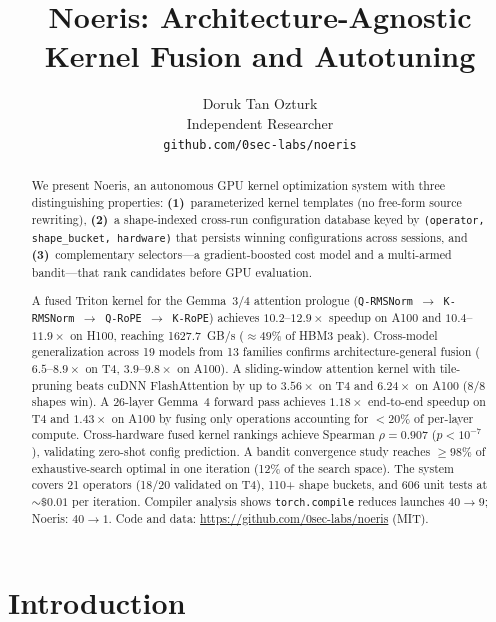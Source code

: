 \documentclass[11pt]{article}
\title{Noeris: Architecture-Agnostic Kernel Fusion and Autotuning}
\author{
  Doruk Tan Ozturk \\
  Independent Researcher \\
  \texttt{github.com/0sec-labs/noeris}
}
\date{}
\begin{document}
\maketitle

\begin{abstract}
We present Noeris, an autonomous GPU kernel optimization system with three
distinguishing properties: \textbf{(1)}~parameterized kernel templates (no
free-form source rewriting), \textbf{(2)}~a shape-indexed cross-run
configuration database keyed by \texttt{(operator, shape\_bucket, hardware)}
that persists winning configurations across sessions, and
\textbf{(3)}~complementary selectors---a gradient-boosted cost model and a
multi-armed bandit---that rank candidates before GPU evaluation.

A fused Triton kernel for the Gemma~3/4 attention prologue
(\texttt{Q-RMSNorm $\to$ K-RMSNorm $\to$ Q-RoPE $\to$ K-RoPE}) achieves
$10.2$--$12.9\times$ speedup on A100 and $10.4$--$11.9\times$ on H100,
reaching 1627.7~GB/s (${\approx}49\%$ of HBM3 peak). Cross-model
generalization across 19 models from 13 families confirms architecture-general
fusion ($6.5$--$8.9\times$ on T4, $3.9$--$9.8\times$ on A100). A
sliding-window attention kernel with tile-pruning beats cuDNN FlashAttention
by up to $3.56\times$ on T4 and $6.24\times$ on A100 (8/8 shapes win). A
26-layer Gemma~4 forward pass achieves $1.18\times$ end-to-end speedup on T4
and $1.43\times$ on A100 by fusing only operations accounting for ${<}20\%$ of
per-layer compute. Cross-hardware fused kernel rankings achieve Spearman
$\rho = 0.907$ ($p < 10^{-7}$), validating zero-shot config prediction. A
bandit convergence study reaches ${\geq}98\%$ of exhaustive-search optimal in
one iteration (12\% of the search space). The system covers 21 operators
(18/20 validated on T4), 110+ shape buckets, and 606 unit tests at
${\sim}\$0.01$ per iteration. Compiler analysis shows \texttt{torch.compile}
reduces launches $40 \to 9$; Noeris: $40 \to 1$. Code and data:
\url{https://github.com/0sec-labs/noeris} (MIT).
\end{abstract}

\section{Introduction}
\label{sec:intro}
\end{document}
